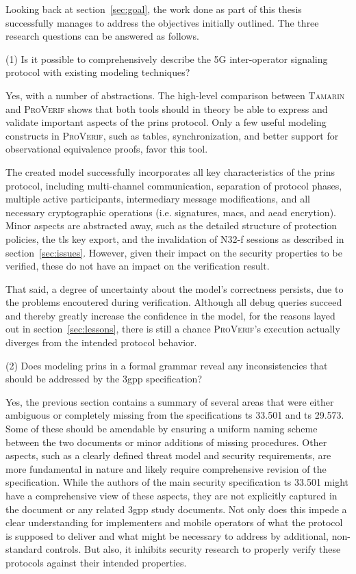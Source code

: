 Looking back at section~\ref{sec:goal}, the work done as part of this thesis successfully manages to address the objectives initially outlined.
The three research questions can be answered as follows.\bigskip

\noindent
(1) Is it possible to comprehensively describe the 5G inter-operator signaling protocol with existing modeling techniques?

Yes, with a number of abstractions.
The high-level comparison between \textsc{Tamarin} and \textsc{ProVerif} shows that both tools should in theory be able to express and validate important aspects of the \gls{prins} protocol.
Only a few useful modeling constructs in \textsc{ProVerif}, such as tables, synchronization, and better support for observational equivalence proofs, favor this tool.

The created model successfully incorporates all key characteristics of the \gls{prins} protocol, including multi-channel communication, separation of protocol phases, multiple active participants, intermediary message modifications, and all necessary cryptographic operations (i.e. signatures, \glspl{mac}, and \gls{aead} encrytion).
Minor aspects are abstracted away, such as the detailed structure of protection policies, the \gls{tls} key export, and the invalidation of N32-f sessions as described in section~\ref{sec:issues}.
However, given their impact on the security properties to be verified, these do not have an impact on the verification result.

That said, a degree of uncertainty about the model's correctness persists, due to the problems encoutered during verification.
Although all debug queries succeed and thereby greatly increase the confidence in the model, for the reasons layed out in section~\ref{sec:lessons}, there is still a chance \textsc{ProVerif}'s execution actually diverges from the intended protocol behavior.\bigskip

\noindent
(2) Does modeling \gls{prins} in a formal grammar reveal any inconsistencies that should be addressed by the \gls{3gpp} specification?

Yes, the previous section contains a summary of several areas that were either ambiguous or completely missing from the specifications \gls{ts} 33.501 and \gls{ts} 29.573.
Some of these should be amendable by ensuring a uniform naming scheme between the two documents or minor additions of missing procedures.
Other aspects, such as a clearly defined threat model and security requirements, are more fundamental in nature and likely require comprehensive revision of the specification.
While the authors of the main security specification \gls{ts} 33.501 might have a comprehensive view of these aspects, they are not explicitly captured in the document or any related \gls{3gpp} study documents.
Not only does this impede a clear understanding for implementers and mobile operators of what the protocol is supposed to deliver and what might be necessary to address by additional, non-standard controls.
But also, it inhibits security research to properly verify these protocols against their intended properties.


